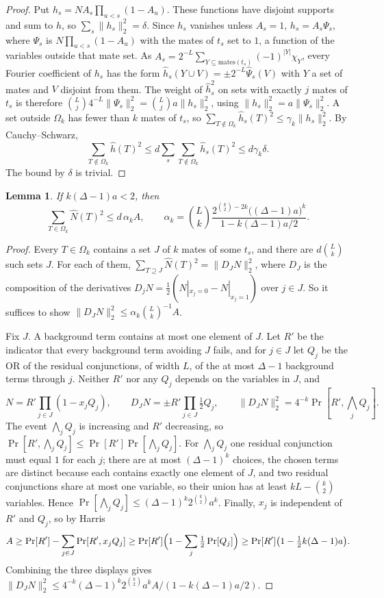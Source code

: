 \documentclass[11pt]{amsart}
\newtheorem{lemma}[theorem]{Lemma}
\theoremstyle{remark}
\begin{document}
\begin{proof}
Put $h_s=N A_s\prod_{u<s}(1-A_u)$. These functions have disjoint supports and sum to $h$, so $\sum_s\|h_s\|_2^2=\delta$.
Since $h_s$ vanishes unless $A_s=1$, $h_s=A_s\Psi_s$, where $\Psi_s$ is $N\prod_{u<s}(1-A_u)$ with the mates of $t_s$
set to $1$, a function of the variables outside that mate set. As
$A_s=2^{-L}\sum_{Y\subseteq\text{mates}(t_s)}(-1)^{|Y|}\chi_Y$, every Fourier coefficient of $h_s$ has the form $\hat
h_s(Y\cup V)=\pm2^{-L}\hat\Psi_s(V)$ with $Y$ a set of mates and $V$ disjoint from them. The weight of $\hat h_s^2$ on
sets with exactly $j$ mates of $t_s$ is therefore $\binom Lj4^{-L}\|\Psi_s\|_2^2=\binom Lja\|h_s\|_2^2$, using
$\|h_s\|_2^2=a\|\Psi_s\|_2^2$. A set outside $\Omega_k$ has fewer than $k$ mates of $t_s$, so
$\sum_{T\notin\Omega_k}\hat h_s(T)^2\le\gamma_k\|h_s\|_2^2$. By Cauchy--Schwarz,
\[
\sum_{T\notin\Omega_k}\hat h(T)^2\le d\sum_s\sum_{T\notin\Omega_k}\hat h_s(T)^2\le d\gamma_k\delta.
\]
The bound by $\delta$ is trivial.
\end{proof}

\begin{lemma}\label{lem:N}
If $k(\Delta-1)a<2$, then
\[
\sum_{T\in\Omega_k}\hat N(T)^2\le d\,\alpha_kA,\qquad
\alpha_k=\binom Lk\frac{2^{\binom k2-2k}\bigl((\Delta-1)a\bigr)^k}{1-k(\Delta-1)a/2}.
\]
\end{lemma}

\begin{proof}
Every $T\in\Omega_k$ contains a set $J$ of $k$ mates of some $t_s$, and there are $d\binom Lk$ such sets $J$. For each
of them, $\sum_{T\supseteq J}\hat N(T)^2=\|D_JN\|_2^2$, where $D_J$ is the composition of the derivatives
$D_jN=\frac12(N|_{x_j=0}-N|_{x_j=1})$ over $j\in J$. So it suffices to show $\|D_JN\|_2^2\le\alpha_k\binom Lk^{-1}A$.

Fix $J$. A background term contains at most one element of $J$. Let $R'$ be the indicator that every background term
avoiding $J$ fails, and for $j\in J$ let $Q_j$ be the OR of the residual conjunctions, of width $L$, of the at most
$\Delta-1$ background terms through $j$. Neither $R'$ nor any $Q_j$ depends on the variables in $J$, and
\[
N=R'\prod_{j\in J}(1-x_jQ_j),\qquad D_JN=\pm R'\prod_{j\in J}\tfrac12Q_j,\qquad \|D_JN\|_2^2=4^{-k}\Pr[R',\textstyle\bigwedge_jQ_j].
\]
The event $\bigwedge_jQ_j$ is increasing and $R'$ decreasing, so $\Pr[R',\bigwedge_jQ_j]\le\Pr[R']\Pr[\bigwedge_jQ_j]$.
For $\bigwedge_jQ_j$ one residual conjunction must equal $1$ for each $j$; there are at most $(\Delta-1)^k$ choices, the
chosen terms are distinct because each contains exactly one element of $J$, and two residual conjunctions share at most
one variable, so their union has at least $kL-\binom k2$ variables. Hence $\Pr[\bigwedge_jQ_j]\le(\Delta-1)^k2^{\binom
k2}a^k$. Finally, $x_j$ is independent of $R'$ and $Q_j$, so by Harris
\[
A\ge\Pr[R']-\sum_{j\in J}\Pr[R',x_jQ_j]\ge\Pr[R']\Bigl(1-\sum_j\tfrac12\Pr[Q_j]\Bigr)\ge\Pr[R']\bigl(1-\tfrac12k(\Delta-1)a\bigr).
\]
Combining the three displays gives $\|D_JN\|_2^2\le4^{-k}(\Delta-1)^k2^{\binom k2}a^kA/(1-k(\Delta-1)a/2)$.
\end{proof}
\end{document}
